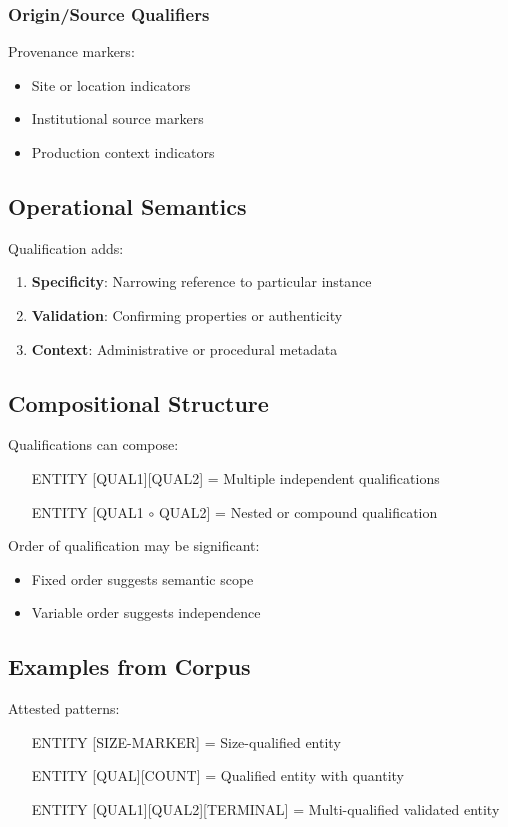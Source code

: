\subsubsection{Origin/Source Qualifiers}
Provenance markers:
\begin{itemize}
    \item Site or location indicators
    \item Institutional source markers
    \item Production context indicators
\end{itemize}

\subsection{Operational Semantics}

Qualification adds:
\begin{enumerate}
    \item \textbf{Specificity}: Narrowing reference to particular instance
    \item \textbf{Validation}: Confirming properties or authenticity
    \item \textbf{Context}: Administrative or procedural metadata
\end{enumerate}

\subsection{Compositional Structure}

Qualifications can compose:
\begin{itemize}
    \item [ENTITY][QUAL1][QUAL2] = Multiple independent qualifications
    \item [ENTITY][QUAL1 $\circ$ QUAL2] = Nested or compound qualification
\end{itemize}

Order of qualification may be significant:
\begin{itemize}
    \item Fixed order suggests semantic scope
    \item Variable order suggests independence
\end{itemize}

\subsection{Examples from Corpus}

Attested patterns:
\begin{itemize}
    \item [ENTITY][SIZE-MARKER] = Size-qualified entity
    \item [ENTITY][QUAL][COUNT] = Qualified entity with quantity
    \item [ENTITY][QUAL1][QUAL2][TERMINAL] = Multi-qualified validated entity
\end{itemize}

